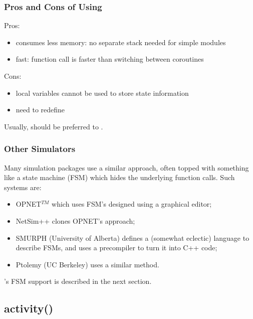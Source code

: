 \subsubsection{Pros and Cons of Using }


Pros:
\begin{itemize}
  \item{consumes less memory: no separate stack needed for simple modules}
  \item{fast: function call is faster than switching between coroutines}
\end{itemize}

Cons:
\begin{itemize}
  \item{local variables cannot be used to store state information}
  \item{need to redefine }
\end{itemize}

Usually,  should be preferred to .


\subsubsection{Other Simulators}


Many simulation packages use a similar approach, often topped with
something like a state machine
(FSM) which hides the underlying function calls. Such
systems are:
\begin{itemize}
  \item{OPNET$^{TM}$ which uses FSM's designed using a graphical editor;}
  \item{NetSim++ clones OPNET's approach;}
  \item{SMURPH (University of Alberta) defines a (somewhat eclectic)
      language to describe FSMs, and uses a precompiler to turn it
      into C++ code;}
  \item{Ptolemy (UC Berkeley) uses a similar method.}
\end{itemize}

{\opp}'s FSM support is described in the next section.



\subsection{activity()}
\label{sec:simple-modules:activity}

